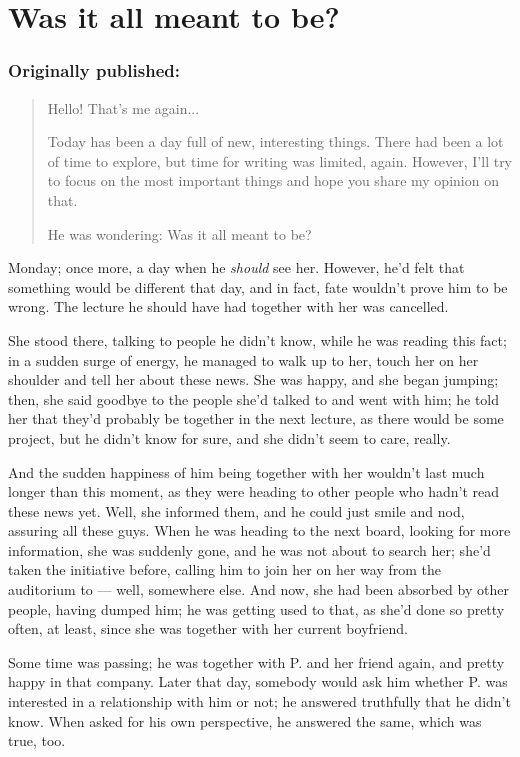\chapter{Was it all meant to be?}
\label{cha:was-it-all-meant-to-be}
\subsection*{Originally published: }
\begin{quote}
Hello! That's me again...

Today has been a day full of new, interesting things. There had been a lot of time to explore, but time for writing was limited, again. However, I'll try to focus on the most important things and hope you share my opinion on that. 

He was wondering: Was it all meant to be?
\end{quote}

Monday; once more, a day when he \emph{should} see her. However, he'd felt that something would be different that day, and in fact, fate wouldn't prove him to be wrong. 
The lecture he should have had together with her was cancelled.

She stood there, talking to people he didn't know, while he was reading this fact; in a sudden surge of energy, he managed to walk up to her, touch her on her shoulder and tell her about these news. 
She was happy, and she began jumping; then, she said goodbye to the people she'd talked to and went with him; he told her that they'd probably be together in the next lecture, as there would be some project, but he didn't know for sure, and she didn't seem to care, really.

And the sudden happiness of him being together with her wouldn't last much longer than this moment, as they were heading to other people who hadn't read these news yet. Well, she informed them, and he could just smile and nod, assuring all these guys. When he was heading to the next board, looking for more information, she was suddenly gone, and he was not about to search her; she'd taken the initiative before, calling him to join her on her way from the auditorium to --- well, somewhere else. And now, she had been absorbed by other people, having dumped him; he was getting used to that, as she'd done so pretty often, at least, since she was together with her current boyfriend.

Some time was passing; he was together with P. and her friend again, and pretty happy in that company. Later that day, somebody would ask him whether P. was interested in a relationship with him or not; he answered truthfully that he didn't know. When asked for his own perspective, he answered the same, which was true, too.

